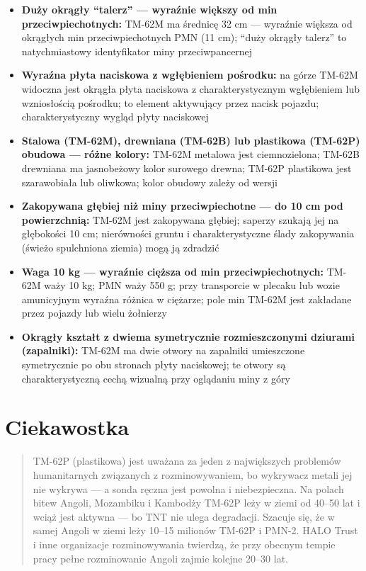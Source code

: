 \documentclass[12pt,openany,oneside]{book}
\providecommand{\tightlist}{%
  \setlength{\itemsep}{0pt}\setlength{\parskip}{0pt}}
\begin{document}
\begin{itemize}
\tightlist
\item
  \textbf{Duży okrągły ``talerz'' --- wyraźnie większy od min
  przeciwpiechotnych:} TM-62M ma średnicę 32 cm --- wyraźnie większa od
  okrągłych min przeciwpiechotnych PMN (11 cm); ``duży okrągły talerz''
  to natychmiastowy identyfikator miny przeciwpancernej
\item
  \textbf{Wyraźna płyta naciskowa z wgłębieniem pośrodku:} na górze
  TM-62M widoczna jest okrągła płyta naciskowa z charakterystycznym
  wgłębieniem lub wzniosłością pośrodku; to element aktywujący przez
  nacisk pojazdu; charakterystyczny wygląd płyty naciskowej
\item
  \textbf{Stalowa (TM-62M), drewniana (TM-62B) lub plastikowa (TM-62P)
  obudowa --- różne kolory:} TM-62M metalowa jest ciemnozielona; TM-62B
  drewniana ma jasnobeżowy kolor surowego drewna; TM-62P plastikowa jest
  szarawobiała lub oliwkowa; kolor obudowy zależy od wersji
\item
  \textbf{Zakopywana głębiej niż miny przeciwpiechotne --- do 10 cm pod
  powierzchnią:} TM-62M jest zakopywana głębiej; saperzy szukają jej na
  głębokości 10 cm; nierówności gruntu i charakterystyczne ślady
  zakopywania (świeżo spulchniona ziemia) mogą ją zdradzić
\item
  \textbf{Waga 10 kg --- wyraźnie cięższa od min przeciwpiechotnych:}
  TM-62M waży 10 kg; PMN waży 550 g; przy transporcie w plecaku lub
  wozie amunicyjnym wyraźna różnica w ciężarze; pole min TM-62M jest
  zakładane przez pojazdy lub wielu żołnierzy
\item
  \textbf{Okrągły kształt z dwiema symetrycznie rozmieszczonymi dziurami
  (zapalniki):} TM-62M ma dwie otwory na zapalniki umieszczone
  symetrycznie po obu stronach płyty naciskowej; te otwory są
  charakterystyczną cechą wizualną przy oglądaniu miny z góry
\end{itemize}

\section{Ciekawostka}\label{ciekawostka-115}

\begin{quote}
TM-62P (plastikowa) jest uważana za jeden z największych problemów
humanitarnych związanych z rozminowywaniem, bo wykrywacz metali jej nie
wykrywa --- a sonda ręczna jest powolna i niebezpieczna. Na polach bitew
Angoli, Mozambiku i Kambodży TM-62P leży w ziemi od 40--50 lat i wciąż
jest aktywna --- bo TNT nie ulega degradacji. Szacuje się, że w samej
Angoli w ziemi leży 10--15 milionów TM-62P i PMN-2. HALO Trust i inne
organizacje rozminowywania twierdzą, że przy obecnym tempie pracy pełne
rozminowanie Angoli zajmie kolejne 20--30 lat.
\end{quote}
\end{document}

